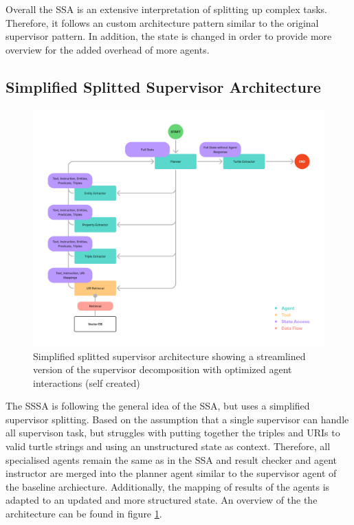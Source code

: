 \documentclass[a4paper,oneside,bibliography=totoc]{scrbook}
\begin{document}
Overall the \ac{SSA} is an extensive interpretation of splitting up complex tasks. Therefore, it follows an custom architecture pattern similar to the original supervisor pattern. In addition, the state is changed in order to provide more overview for the added overhead of more agents.

\subsection{Simplified Splitted Supervisor Architecture}
\label{subsec:simplified_splitted_supervisor}
\begin{figure}[h]
  \centering
  \includegraphics[width=\textwidth]{figures/Simplified Splitted Supervisor Architecture.png}
  \caption[Simplified splitted supervisor architecture showing a streamlined version of the supervisor decomposition with optimized agent interactions]{Simplified splitted supervisor architecture showing a streamlined version of the supervisor decomposition with optimized agent interactions (self created)}
  \label{fig:simplified_splitted_supervisor_architecture}
\end{figure}

The \ac{SSSA} is following the general idea of the \ac{SSA}, but uses a simplified supervisor splitting. Based on the assumption that a single supervisor can handle all supervison task, but struggles with putting together the triples and URIs to valid turtle strings and using an unstructured state as context. Therefore, all specialised agents remain the same as in the \ac{SSA} and result checker and agent instructor are merged into the planner agent similar to the supervisor agent of the baseline archiecture. Additionally, the mapping of results of the agents is adapted to an updated and more structured state. An overview of the the architecture can be found in figure \ref{fig:simplified_splitted_supervisor_architecture}.
\end{document}

